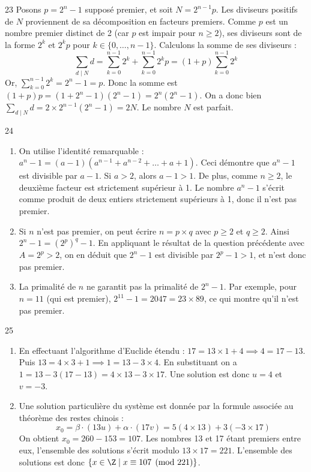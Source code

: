 \begin{correction}{23}
Posons $p = 2^n - 1$ supposé premier, et soit $N = 2^{n-1}p$.
Les diviseurs positifs de $N$ proviennent de sa décomposition en facteurs premiers. Comme $p$ est un nombre premier distinct de 2 (car $p$ est impair pour $n\ge2$), ses diviseurs sont de la forme $2^k$ et $2^k p$ pour $k \in \{0, \dots, n-1\}$.
Calculons la somme de ses diviseurs :
\[\sum_{d \mid N} d = \sum_{k=0}^{n-1} 2^k + \sum_{k=0}^{n-1} 2^k p = (1+p) \sum_{k=0}^{n-1} 2^k\]
Or, $\sum_{k=0}^{n-1} 2^k = 2^n - 1 = p$.
Donc la somme est $(1+p)p = (1 + 2^n - 1)(2^n - 1) = 2^n (2^n - 1)$.
On a donc bien $\sum_{d \mid N} d = 2 \times 2^{n-1} (2^n - 1) = 2N$. Le nombre $N$ est parfait.
\end{correction}

\begin{correction}{24}
\begin{enumerate}
 \item[a)] On utilise l'identité remarquable : $a^n - 1 = (a-1)(a^{n-1} + a^{n-2} + \dots + a + 1)$. 
 Ceci démontre que $a^n-1$ est divisible par $a-1$. Si $a>2$, alors $a-1 > 1$. 
 De plus, comme $n \ge 2$, le deuxième facteur est strictement supérieur à 1. Le nombre $a^n-1$ s'écrit comme produit de deux entiers strictement supérieurs à 1, donc il n'est pas premier. 
 \item[b)] Si $n$ n'est pas premier, on peut écrire $n = p \times q$ avec $p \ge 2$ et $q \ge 2$. 
 Ainsi $2^n - 1 = (2^p)^q - 1$. 
 En appliquant le résultat de la question précédente avec $A = 2^p > 2$, on en déduit que $2^n - 1$ est divisible par $2^p - 1 > 1$, et n'est donc pas premier. 
 \item[c)] La primalité de $n$ ne garantit pas la primalité de $2^n-1$. Par exemple, pour $n=11$ (qui est premier), $2^{11}-1 = 2047 = 23 \times 89$, ce qui montre qu'il n'est pas premier. 
\end{enumerate}
\end{correction}

\begin{correction}{25}
\begin{enumerate}
 \item[a)] En effectuant l'algorithme d'Euclide étendu : $17 = 13 \times 1 + 4 \implies 4 = 17 - 13$. 
 Puis $13 = 4 \times 3 + 1 \implies 1 = 13 - 3 \times 4$. 
 En substituant on a $1 = 13 - 3(17 - 13) = 4 \times 13 - 3 \times 17$. 
 Une solution est donc $u = 4$ et $v = -3$. 
 \item[b)] Une solution particulière du système est donnée par la formule associée au théorème des restes chinois :
 \[x_0 = \beta \cdot (13u) + \alpha \cdot (17v) = 5(4 \times 13) + 3(-3 \times 17)\]
 On obtient $x_0 = 260 - 153 = 107$. 
 Les nombres 13 et 17 étant premiers entre eux, l'ensemble des solutions s'écrit modulo $13 \times 17 = 221$. 
 L'ensemble des solutions est donc $\{x \in \Z \mid x \equiv 107 \pmod{221}\}$. 
\end{enumerate}
\end{correction}

